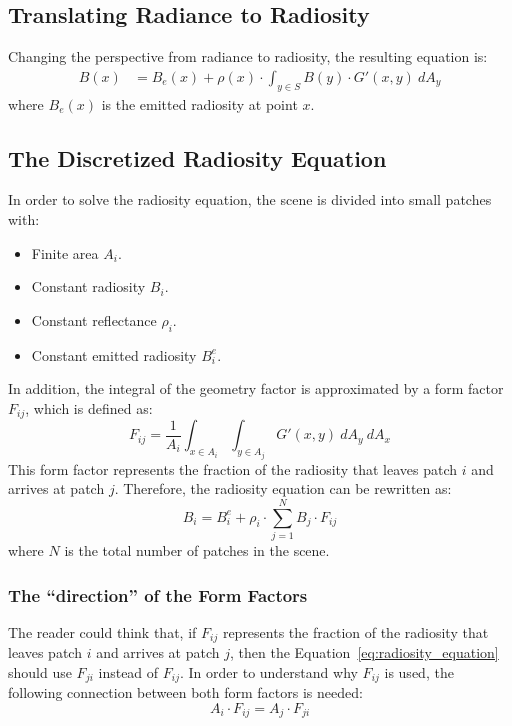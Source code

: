 \subsection{Translating Radiance to Radiosity}

Changing the perspective from radiance to radiosity, the resulting equation is:
\begin{align*}
    B(x) &= B_e(x) + \rho(x) \cdot \int_{y\in S} B(y) \cdot G'(x, y) \ dA_y
\end{align*}
where $B_e(x)$ is the emitted radiosity at point $x$.

\subsection{The Discretized Radiosity Equation}

In order to solve the radiosity equation, the scene is divided into small patches with:
\begin{itemize}
    \item Finite area $A_i$.
    \item Constant radiosity $B_i$.
    \item Constant reflectance $\rho_i$.
    \item Constant emitted radiosity $B_i^e$.
\end{itemize}

In addition, the integral of the geometry factor is approximated by a form factor $F_{ij}$, which is defined as:
\begin{equation*}
    F_{ij} = \frac{1}{A_i} \int_{x\in A_i} \int_{y\in A_j} G'(x, y) \ dA_y \ dA_x
\end{equation*}
This form factor represents the fraction of the radiosity that leaves patch $i$ and arrives at patch $j$. Therefore, the radiosity equation can be rewritten as:
\begin{equation}\label{eq:radiosity_equation}
    B_i = B_i^e + \rho_i \cdot \sum_{j=1}^N B_j\cdot F_{ij}
\end{equation}
where $N$ is the total number of patches in the scene.

\subsubsection{The ``direction'' of the Form Factors}

The reader could think that, if $F_{ij}$ represents the fraction of the radiosity that leaves patch $i$ and arrives at patch $j$, then the Equation~\ref{eq:radiosity_equation} should use $F_{ji}$ instead of $F_{ij}$. In order to understand why $F_{ij}$ is used, the following connection between both form factors is needed:
\begin{equation*}
    A_i \cdot F_{ij} = A_j \cdot F_{ji}
\end{equation*}

